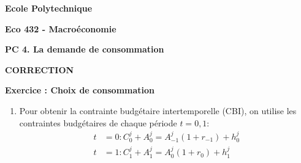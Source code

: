 \documentclass[a4paper,11pt]{article}
\begin{document}
\begin{center}
\textbf{Ecole Polytechnique}

\bigskip

\textbf{Eco 432 - Macro\'{e}conomie}

\bigskip

\textbf{PC 4. La demande de consommation}

\bigskip

\textbf{CORRECTION}
\end{center}


\bigskip


\noindent \textbf{Exercice : Choix de consommation}

\smallskip


\begin{enumerate}
\item  Pour obtenir la contrainte budg\'{e}taire intertemporelle (CBI), on utilise
les contraintes budg\'{e}taires de chaque p\'{e}riode $t=0,1$:
\begin{align*}
t& =0:C_{0}^{j}+A_{0}^{j}=A_{-1}^{j}\left( 1+r_{-1}\right) + h^j_0 \\
t& =1:C_{1}^{j}+A_{1}^{j}=A_{0}^{j}\left( 1+r_{0}\right) + h^j_1 \\
\end{align*}

 


\end{enumerate}
\end{document}
